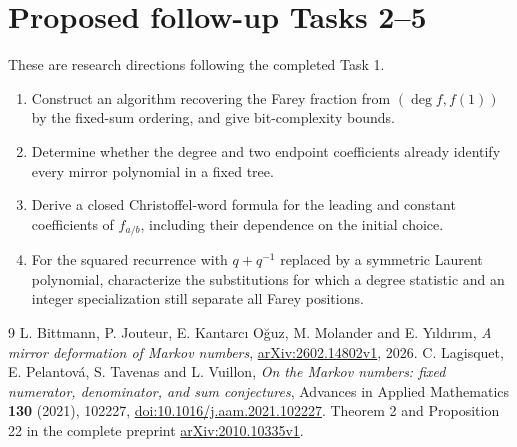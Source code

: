 \documentclass[11pt]{article}
\begin{document}
\section*{Proposed follow-up Tasks 2--5}
These are research directions following the completed Task 1.
\begin{enumerate}[label=\textbf{Task \arabic*.},start=2,leftmargin=*]
\item Construct an algorithm recovering the Farey fraction from
$(\deg f,f(1))$ by the fixed-sum ordering, and give bit-complexity bounds.
\item Determine whether the degree and two endpoint coefficients already
identify every mirror polynomial in a fixed tree.
\item Derive a closed Christoffel-word formula for the leading and constant
coefficients of $f_{a/b}$, including their dependence on the initial choice.
\item For the squared recurrence with $q+q^{-1}$ replaced by a symmetric
Laurent polynomial, characterize the substitutions for which a degree
statistic and an integer specialization still separate all Farey positions.
\end{enumerate}

\begin{thebibliography}{9}
 L. Bittmann, P. Jouteur, E. Kantarc{\i} O\u{g}uz,
M. Molander and E. Y{\i}ld{\i}r{\i}m,
\emph{A mirror deformation of Markov numbers},
\href{https://arxiv.org/abs/2602.14802}{arXiv:2602.14802v1}, 2026.
 C. Lagisquet, E. Pelantov\'a, S. Tavenas and L. Vuillon,
\emph{On the Markov numbers: fixed numerator, denominator, and sum conjectures},
Advances in Applied Mathematics \textbf{130} (2021), 102227,
\href{https://doi.org/10.1016/j.aam.2021.102227}{doi:10.1016/j.aam.2021.102227}.
Theorem 2 and Proposition 22 in the complete preprint
\href{https://arxiv.org/abs/2010.10335}{arXiv:2010.10335v1}.
\end{thebibliography}
\end{document}
